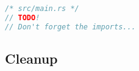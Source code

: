 \begin{lstlisting}[language=rust]
/* src/main.rs */
// TODO!
// Don't forget the imports...
\end{lstlisting}

\subsection{Cleanup}







